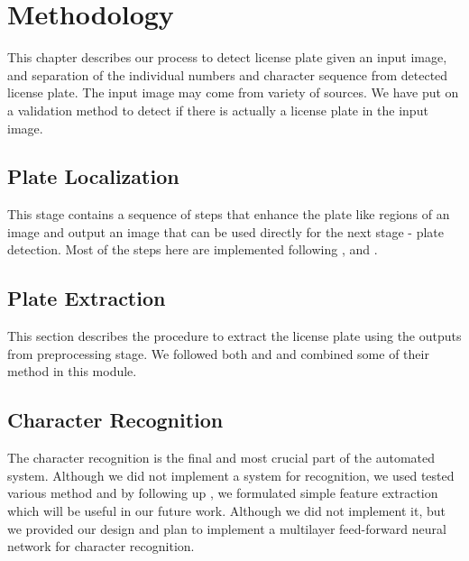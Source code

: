 \documentclass{standalone}
\begin{document}
\chapter{Methodology}
This chapter describes our process to detect license plate given an input image, and separation of the individual numbers and character sequence from detected license plate. The input image may come from variety of sources. We have put on a validation method to detect if there is actually a license plate in the input image.

  
  

\section{Plate Localization}
This stage contains a sequence of steps that enhance the plate like regions of an image and output an image that can be used directly for the next stage - plate detection. Most of the steps here are implemented following \cite{joarder2012bangla}, \cite{Abolghasemi2009} and \cite{zheng2005efficient}.  

  
  
  
  
  
  
  

\section{Plate Extraction}
This section describes the procedure to extract the license plate using the outputs from preprocessing stage. We followed both \cite{joarder2012bangla} and  \cite{alshahrani2013real} and combined some of their method in this module.

  
  
  
  
  



\section{Character Recognition}
The character recognition is the final and most crucial part of the automated system. Although we did not implement a system for recognition, we used tested various method and by following up \cite{joarder2012bangla}, we formulated simple feature extraction which will be useful in our future work. Although we did not implement it, but we provided our design and plan to implement a multilayer feed-forward neural network for character recognition.

  
  
\end{document}
